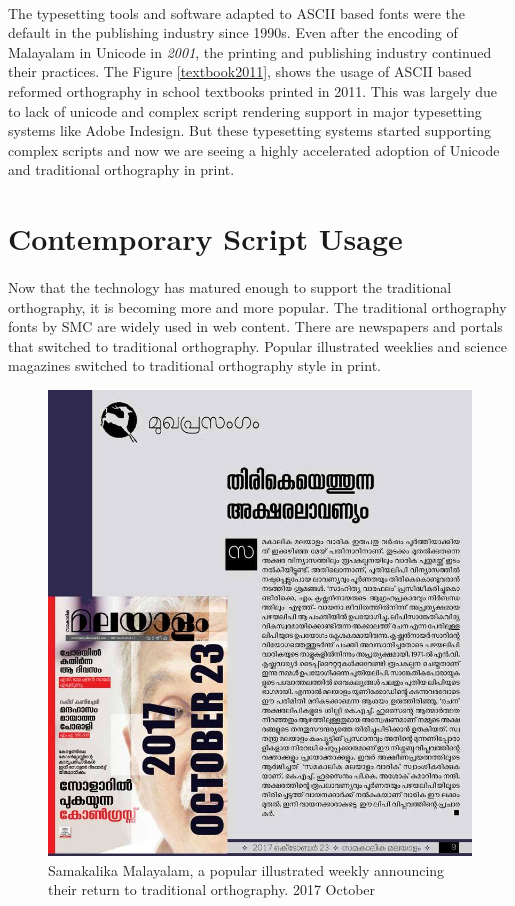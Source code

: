 \documentclass[10pt]{article}
\begin{document}
\paragraph{}
The typesetting tools and software adapted to ASCII based fonts were the default in the publishing industry since 1990s. Even after the encoding of Malayalam in Unicode in \textit{2001}, the printing and publishing industry continued their practices. The Figure \ref{textbook2011}, shows the usage of ASCII based reformed orthography in school textbooks printed in 2011. This was largely due to lack of unicode and complex script rendering support in major typesetting systems like Adobe Indesign. But these typesetting systems started supporting complex scripts and now we are seeing a highly accelerated adoption of Unicode and traditional orthography in print.

\section{Contemporary Script Usage}
\paragraph{}
Now that the technology has matured enough to support the traditional orthography, it is becoming more and more popular. The traditional orthography fonts by SMC are widely used in web content. There are newspapers and portals that switched to traditional orthography. Popular illustrated weeklies and science magazines switched to traditional orthography style in print. 

\begin{figure}[H]
	\centering
	\includegraphics[scale=0.4]{images/samakalikamalayalam.jpg}
	\caption{Samakalika Malayalam, a popular illustrated weekly announcing their return to traditional orthography. 2017 October}
	\label{samakalikam}
\end{figure}
\end{document}
